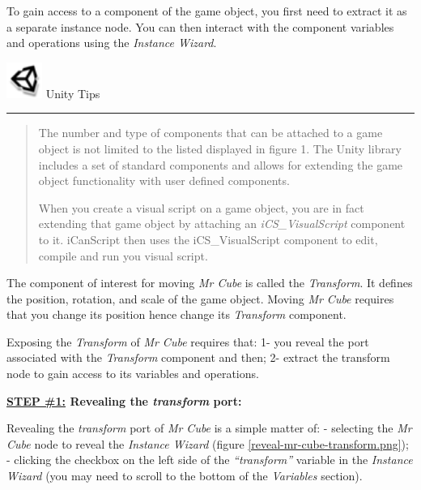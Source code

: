 To gain access to a component of the game object, you first need to extract it as a separate instance node. You can then interact with the component variables and operations using the \emph{Instance Wizard}.
\begin{tipbox}

\includegraphics[width=33pt,height=33pt]{UnityLogo_32x32.png} {\Large \color{black} Unity Tips }

\begin{center}\rule{\textwidth}{0.4pt}\end{center}

\begin{quote}

The number and type of components that can be attached to a game object is not limited to the listed displayed in figure 1. The Unity library includes a set of standard components and allows for extending the game object functionality with user defined components.

When you create a visual script on a game object, you are in fact extending that game object by attaching an \emph{iCS\_VisualScript} component to it. iCanScript then uses the iCS\_VisualScript component to edit, compile and run you visual script.
\end{quote}

\end{tipbox}



The component of interest for moving \emph{Mr Cube} is called the \emph{Transform}. It defines the position, rotation, and scale of the game object. Moving \emph{Mr Cube} requires that you change its position hence change its \emph{Transform} component.

Exposing the \emph{Transform} of \emph{Mr Cube} requires that:
1- you reveal the port associated with the \emph{Transform} component and then;
2- extract the transform node to gain access to its variables and operations.

\textbf{\underline{STEP \#1:} Revealing the \emph{transform} port:}

Revealing the \emph{transform} port of \emph{Mr Cube} is a simple matter of:
- selecting the \emph{Mr Cube} node to reveal the \emph{Instance Wizard} (figure \ref{reveal-mr-cube-transform.png});
- clicking the checkbox on the left side of the \emph{``transform''} variable in the \emph{Instance Wizard} (you may need to scroll to the bottom of the \emph{Variables} section).

